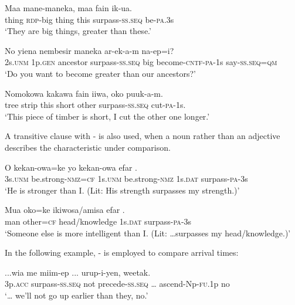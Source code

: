 \ea%
\label{ex:6:x1327}
\gll Maa  mane-maneka,  maa  fain    ik-ua. \\
thing  \textsc{rdp}-big  thing  this  surpass-\textsc{ss}.\textsc{seq}  be-\textsc{pa}.3s\\
\glt `They are big things, greater than these.'
\z

\ea%
\label{ex:6:x1328}
\gll No  yiena  nembesir    maneka ar-ek-a-m  na-ep=i?\\
2s.\textsc{unm}  1p.\textsc{gen}  ancestor  surpass-\textsc{ss}.\textsc{seq}  big become-\textsc{cntf}-\textsc{pa}-1s  say-\textsc{ss}.\textsc{seq}=\textsc{qm}\\
\glt `Do you want to become greater than our ancestors?'
\z

\ea%
\label{ex:6:x1333}
\gll Nomokowa  kakawa  fain  iiwa,  oko    puuk-a-m. \\
tree  strip  this  short  other  surpass-\textsc{ss}.\textsc{seq}  cut-\textsc{pa}-1s.\\
\glt `This piece of timber is short, I cut the other one longer.'
\z

A transitive clause with - is also used, when a noun rather than an adjective describes the characteristic under comparison. 

\ea%
\label{ex:6:x1329}
\gll O  kekan-owa=ke  yo  kekan-owa  efar .\\
3s.\textsc{unm}  be.strong-\textsc{nmz}=\textsc{cf}  1s.\textsc{unm}  be.strong-\textsc{nmz}  1s.\textsc{dat} surpass-\textsc{pa}-3s\\
\glt `He is stronger than I. (Lit: His strength surpasses my strength.)'
\z

\ea%
\label{ex:6:x1894}
\gll Mua  oko=ke  ikiwosa/amisa  efar  . \\
man  other=\textsc{cf}  head/knowledge  1s.\textsc{dat}  surpass-\textsc{pa}-3s\\
\glt `Someone else is more intelligent than I. (Lit: {\dots}surpasses my head/knowledge.)'
\z

In the following example, - is employed to compare arrival times:

\ea%
\label{ex:6:x1895}
\gll ...wia    me  miim-ep  ... urup-i-yen,  weetak.\\
3p.\textsc{acc}  surpass-\textsc{ss}.\textsc{seq}  not  precede-\textsc{ss}.\textsc{seq}  {\dots} ascend-Np-\textsc{fu}.1p  no\\
\glt `{\dots} we'll not go up earlier than they, no.'
\z

